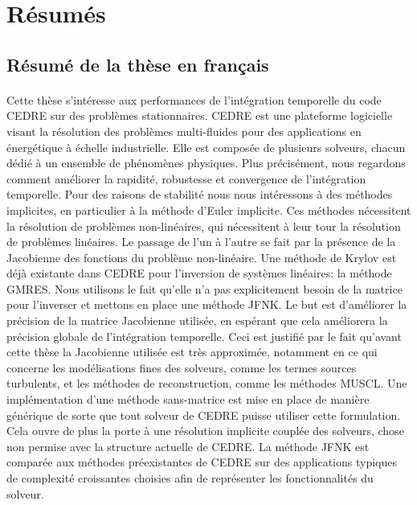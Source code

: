 \pagebreak
\section*{Résumés}

  \subsection*{Résumé de la thèse en français}

    \paragraph{}
    Cette thèse s'intéresse aux performances de l'intégration temporelle du code CEDRE sur des problèmes stationnaires.
    CEDRE est une plateforme logicielle visant la résolution des problèmes multi-fluides pour des applications en énergétique à échelle industrielle.
    Elle est composée de plusieurs solveurs, chacun dédié à un ensemble de phénomènes physiques.
    Plus précisément, nous regardons comment améliorer la rapidité, robustesse et convergence de l’intégration temporelle.
    Pour des raisons de stabilité nous nous intéressons à des méthodes implicites, en particulier à la méthode d'Euler implicite.
    Ces méthodes nécessitent la résolution de problèmes non-linéaires, qui nécessitent à leur tour la résolution de problèmes linéaires.
    Le passage de l'un à l'autre se fait par la présence de la Jacobienne des fonctions du problème non-linéaire.
    Une méthode de Krylov est déjà existante dans CEDRE pour l'inversion de systèmes linéaires: la méthode GMRES.
    Nous utilisons le fait qu'elle n'a pas explicitement besoin de la matrice pour l'inverser et mettons en place une méthode JFNK.
    Le but est d'améliorer la précision de la matrice Jacobienne utilisée, en espérant que cela améliorera la précision globale de l'intégration temporelle.
    Ceci est justifié par le fait qu'avant cette thèse la Jacobienne utilisée est très approximée, notamment en ce qui concerne les modélisations fines des solveurs, comme les termes sources turbulents, et les méthodes de reconstruction, comme les méthodes MUSCL.
    Une implémentation d'une méthode sans-matrice est mise en place de manière générique de sorte que tout solveur de CEDRE puisse utiliser cette formulation.
    Cela ouvre de plus la porte à une résolution implicite couplée des solveurs, chose non permise avec la structure actuelle de CEDRE.
    La méthode JFNK est comparée aux méthodes préexistantes de CEDRE sur des applications typiques de complexité croissantes choisies afin de représenter les fonctionnalités du solveur.

